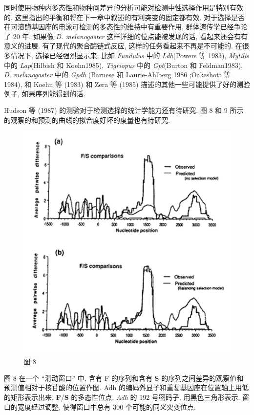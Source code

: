 \documentclass[12pt]{article}
\begin{document}
同时使用物种内多态性和物种间差异的分析可能对检测中性选择作用是特别有效的,
这里指出的平衡和将在下一章中叙述的有利突变的固定都有效. 对于选择是否在可溶酶基因座的电泳可检测的多态性的维持中有重要作用,
群体遗传学已经争论了 20 年. 如果像 \textit{D. melanogaster} 这样详细的位点能被发现的话, 看起来还会有有意义的进展.
有了现代的聚合酶链式反应, 这样的任务看起来不再是不可能的. 在很多情况下, 选择已经强烈显示来,
比如 \textit{Fundulus} 中的 \textit{Ldh}(Powers 等 1983), \textit{Mytilis} 中的 \textit{Lap}(Hilbish 和
Koehn1985), \textit{Tigriopus} 中的 \textit{Gpt}(Burton 和 Feldman1983), \textit{D.
    melanogaster} 中的 \textit{Gpdh} (Barnese 和 Laurie-Ahlberg 1986 ;Oakeshott 等 1984), 和 Koehn 等 (1983)
和 Zera 等 (1985) 描述的其他一些可能提供了好的测验例子, 如果序列能得到的话.

Hudson 等 (1987) 的测验对于检测选择的统计学能力还有待研究. 图 8 和 9
所示的观察的和预测的曲线的拟合度好坏的度量也有待研究.

\begin{figure}
    \centering
    \includegraphics{coalescent-process.images/image8.png}
    \caption{图 8}
\end{figure}

图 8 在一个 ``滑动窗口'' 中, 含有 F 的序列和含有 \textbf{S} 的序列之间差异的观察值和预测值相对于核苷酸的位置作图. Adh
的编码外显子和重复基因座在位置轴上用低的矩形表示出来. \textbf{F}/\textbf{S} 的多态性位点, \textit{Adh} 的 192
号密码子, 用黑色三角形表示. 窗口的宽度经过调整, 使得窗口中总有 300 个可能的同义突变位点.
\end{document}
